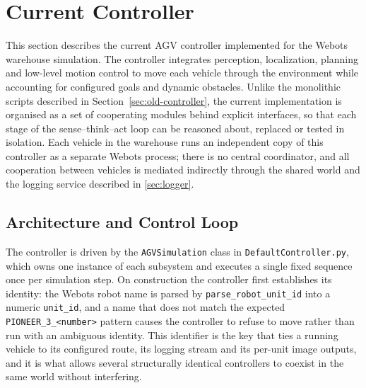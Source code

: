 \section{Current Controller}
\label{sec:controllers}

This section describes the current AGV controller implemented for the Webots warehouse simulation. The controller integrates perception, localization, planning and low-level motion control to move each vehicle through the environment while accounting for configured goals and dynamic obstacles. Unlike the monolithic scripts described in Section~\ref{sec:old-controller}, the current implementation is organised as a set of cooperating modules behind explicit interfaces, so that each stage of the sense--think--act loop can be reasoned about, replaced or tested in isolation. Each vehicle in the warehouse runs an independent copy of this controller as a separate Webots process; there is no central coordinator, and all cooperation between vehicles is mediated indirectly through the shared world and the logging service described in \cref{sec:logger}.

\subsection{Architecture and Control Loop}
\label{subsec:controllers-architecture}

The controller is driven by the \texttt{AGVSimulation} class in \texttt{DefaultController.py}, which owns one instance of each subsystem and executes a single fixed sequence once per simulation step. On construction the controller first establishes its identity: the Webots robot name is parsed by \texttt{parse\_robot\_unit\_id} into a numeric \texttt{unit\_id}, and a name that does not match the expected \texttt{PIONEER\_3\_<number>} pattern causes the controller to refuse to move rather than run with an ambiguous identity. This identifier is the key that ties a running vehicle to its configured route, its logging stream and its per-unit image outputs, and it is what allows several structurally identical controllers to coexist in the same world without interfering.

